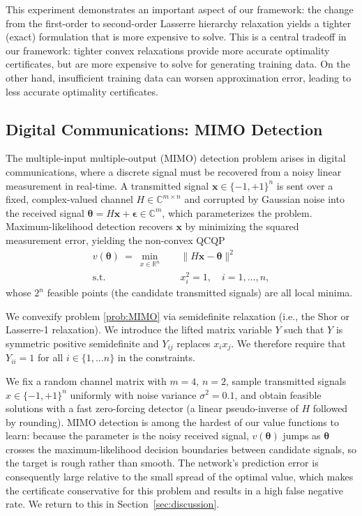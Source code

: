 \documentclass[10pt]{article} %
\theoremstyle{plain}
\theoremstyle{definition}
\theoremstyle{remark}
\begin{document}
This experiment demonstrates an important aspect of our framework: the change from the first-order to second-order Lasserre hierarchy relaxation yields a tighter (exact) formulation that is more expensive to solve. This is a central tradeoff in our framework: tighter convex relaxations provide more accurate optimality certificates, but are more expensive to solve for generating training data. On the other hand, insufficient training data can worsen approximation error, leading to less accurate optimality certificates.

\subsection{Digital Communications: MIMO Detection}

The multiple-input multiple-output (MIMO) detection problem arises in digital communications, where a discrete signal must be recovered from a noisy linear measurement in real-time. A transmitted signal $\mathbf{x} \in \{-1, +1\}^n$ is sent over a fixed, complex-valued channel $H \in \mathbb{C}^{m \times n}$ and corrupted by Gaussian noise into the received signal $\bm{\theta} = H \mathbf{x} + \bm{\epsilon} \in \mathbb{C}^{m}$, which parameterizes the problem. Maximum-likelihood detection recovers $\mathbf{x}$ by minimizing the squared measurement error, yielding the non-convex QCQP
\begin{equation}
\begin{aligned}
    v(\bm{\theta}) ~=~ \min_{x \in \mathbb{R}^n} \quad & \|H \mathbf{x} - \bm{\theta}\|^2 \\
    \text{s.t.} \quad & x_i^2 = 1, \quad i = 1, \ldots, n,
\end{aligned}
\label{prob:MIMO}
\end{equation}
whose $2^n$ feasible points (the candidate transmitted signals) are all local minima.

We convexify problem \cref{prob:MIMO}{}{} via semidefinite relaxation (i.e., the Shor or Lasserre-1 relaxation). We introduce the lifted matrix variable $Y$ such that $Y$ is symmetric positive semidefinite and $Y_{ij}$ replaces $x_i x_j$. We therefore require that $Y_{ii} = 1$ for all $i \in \{1, \dots n\}$ in the constraints.

We fix a random channel matrix with $m = 4$, $n = 2$, sample transmitted signals $x \in \{-1, +1\}^n$ uniformly with noise variance $\sigma^2 = 0.1$, and obtain feasible solutions with a fast zero-forcing detector (a linear pseudo-inverse of $H$ followed by rounding). MIMO detection is among the hardest of our value functions to learn: because the parameter is the noisy received signal, $v(\bm{\theta})$ jumps as $\bm{\theta}$ crosses the maximum-likelihood decision boundaries between candidate signals, so the target is rough rather than smooth. The network's prediction error is consequently large relative to the small spread of the optimal value, which makes the certificate conservative for this problem and results in a high false negative rate. We return to this in Section~\ref{sec:discussion}.
\end{document}
